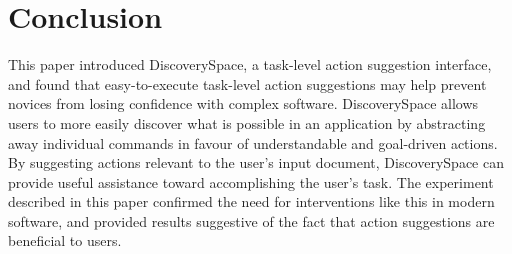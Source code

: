 \section{Conclusion}
This paper introduced Discovery\-Space, a task-level action suggestion interface, and found that easy-to-execute task-level action suggestions may help prevent novices from losing confidence with complex software. Discovery\-Space allows users to more easily discover what is possible in an application by abstracting away individual commands in favour of understandable and goal-driven actions. By suggesting actions relevant to the user's input document, Discovery\-Space can provide useful assistance toward accomplishing the user's task. The experiment described in this paper confirmed the need for interventions like this in modern software, and provided results suggestive of the fact that action suggestions are beneficial to users. 